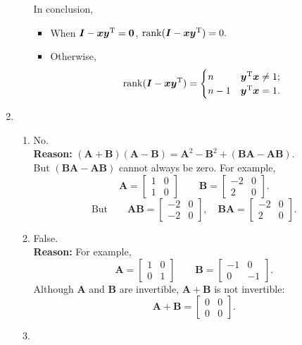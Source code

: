 \begin{enumerate}
\begin{enumerate}
\begin{enumerate}
\begin{itemize}
\begin{enumerate}
\end{enumerate}
\end{itemize}
\end{enumerate}
In conclusion, 
\begin{itemize}
\item
When $\bm I-\bm x\bm y^{\mathrm T}=\bm0$, $\operatorname{rank}(\bm I-\bm x\bm y^{\mathrm T})=0.$
\item
Otherwise,
\[
\operatorname{rank}(\bm I-\bm x\bm y^{\mathrm T})=\begin{cases}
n&\bm y^{\mathrm T}\bm x\ne1;\\
n-1&\bm y^{\mathrm T}\bm x=1.
\end{cases}
\]
\end{itemize}
\end{enumerate}
\item
\begin{enumerate}
\item
No.\\
\textbf{Reason: }$(\bm A+\bm B)(\bm A-\bm B)=\bm A^2-\bm B^2+(\bm{BA}-\bm{AB})$.\\ But $(\bm{BA}-\bm{AB})$ cannot always be zero. For example,
\[
\bm A=\begin{bmatrix}
1&0\\1&0
\end{bmatrix}\qquad
\bm B=\begin{bmatrix}
-2&0\\2&0
\end{bmatrix}.
\]
\[
\text{But}\qquad\bm{AB}=\begin{bmatrix}
-2&0\\-2&0
\end{bmatrix},\quad\bm{BA}=\begin{bmatrix}
-2&0\\2&0
\end{bmatrix}.
\]
\item
False.\\
\textbf{Reason: } For example, 
\[
\bm A=\begin{bmatrix}
1&0\\0&1
\end{bmatrix}\qquad\bm B=\begin{bmatrix}
-1&0\\0&-1
\end{bmatrix}.
\]
Although $\bm A$ and $\bm B$ are invertible, $\bm A+\bm B$ is not invertible:
\[
\bm A+\bm B=\begin{bmatrix}
0&0\\0&0
\end{bmatrix}.
\]
\item

\end{enumerate}
\end{enumerate}
